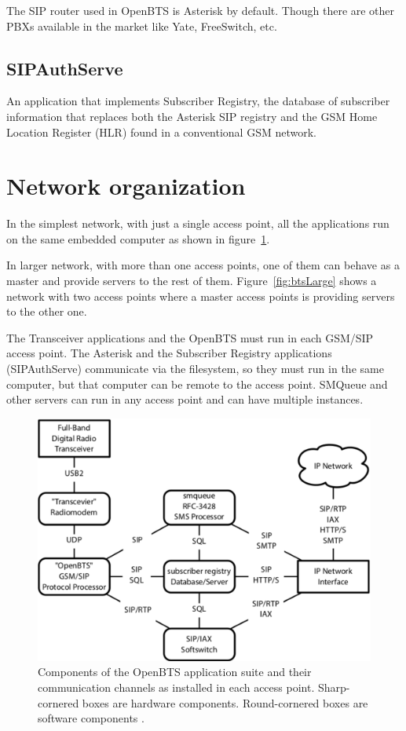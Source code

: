 The SIP router used in OpenBTS is Asterisk by default. Though there are other
PBXs available in the market like Yate, FreeSwitch, etc.

\subsection{SIPAuthServe}
An application that implements Subscriber Registry, the database of subscriber 
information that replaces both the Asterisk SIP registry and the GSM Home 
Location Register (HLR) found in a conventional GSM network.

\section{Network organization}
In the simplest network, with just a single access point, all the applications run
on the same embedded computer as shown in figure~\ref{fig:btsSimple}.

In larger network, with more than one access points, one of them can behave as a master and provide servers to the rest of them.
Figure~\ref{fig:btsLarge} shows a network with two access points where
a master access points is providing servers to the other one.

The Transceiver applications and the OpenBTS must run in each GSM/SIP access point. 
The Asterisk and the Subscriber Registry applications (SIPAuthServe) 
communicate via the filesystem, so they must run in the same computer,
but that computer can be remote to the access point. 
SMQueue and other servers can run in any access point and can have 
multiple instances.
\begin{figure}
  \centering
    \includegraphics[width=\textwidth]{../images/btsSimple}
  \caption[Simplest OpenBTS network]{Components of the OpenBTS application suite 
  and their communication channels as installed in each
access point. Sharp-cornered boxes are hardware components.
Round-cornered boxes are software components \protect\cite{openbtsMan}.}
  \label{fig:btsSimple}
\end{figure}

